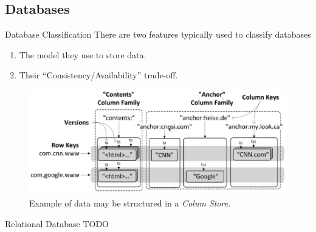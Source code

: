 \documentclass[11pt,a4paper]{article}
\begin{document}
\subsection{Databases}

  \begin{remark}{Database Classification}
    There are two features typically used to classify databases
    \begin{enumerate}
      \item The model they use to store data.
      \item Their ``Consistency/Availability'' trade-off.
    \end{enumerate}
  \end{remark}

  \begin{figure}[H]
    \centering
    \includegraphics[width=.7\textwidth]{ColumnStores.PNG}
    \caption{Example of data may be structured in a \textit{Colum Store}.}
    \label{fig_ColumnStores}
  \end{figure}

  \begin{definition}{Relational Database}
    TODO
  \end{definition}
\end{document}
